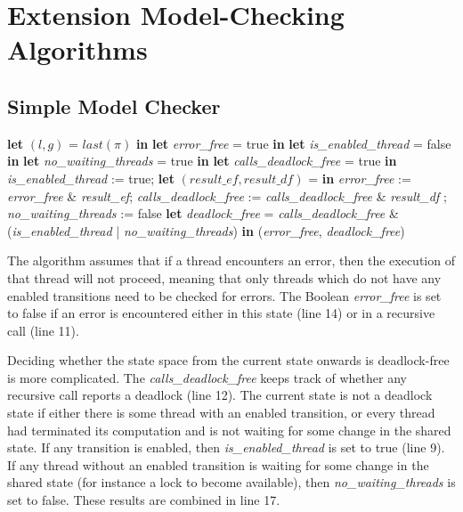 \documentclass[12pt,a4paper,twoside,openright]{report}
\newcommand{\Let}[2]{\State \textbf{let} #1 = #2 \textbf{in}}
\begin{document}
\chapter{Extension Model-Checking Algorithms}
\label{app:pseudocode}
\section{Simple Model Checker}
\label{sapp:simple-code}
\begin{algorithmic}[1]
	\Let{$(l, g)$}
	{$\textit{last}(\pi)$}
	\Let{\textit{error\_free}}{true}
	\Let{\textit{is\_enabled\_thread}}{false}
	\Let{\textit{no\_waiting\_threads}}{true}
	\Let{\textit{calls\_deadlock\_free}}{true}
	\State \textit{is\_enabled\_thread} := true;
	\Let{$(\textit{result\_ef}, \textit{result\_df})$}
	{\Call{Check}{$\sigma_0, \pi.\textit{next}(\sigma, p)$}}
	\State \textit{error\_free} := \textit{error\_free}
	\& \textit{result\_ef};
	\State \textit{calls\_deadlock\_free}
	:= \textit{calls\_deadlock\_free}
	\& \textit{result\_df}
	\Else
	;
	\EndIf
	{\textit{no\_waiting\_threads} := false}
	\EndIf
	\EndIf
	\EndFor
	\Let{\textit{deadlock\_free}}{\textit{calls\_deadlock\_free} \&
		(\textit{is\_enabled\_thread} | \textit{no\_waiting\_threads})}
	\State \Return (\textit{error\_free}, \textit{deadlock\_free})
	\EndProcedure
\end{algorithmic}

The algorithm assumes that if a thread
encounters an error, then the execution
of that thread will not proceed, meaning
that only threads which do not have any
enabled transitions need to be checked
for errors. The Boolean \textit{error\_free}
is set to false if an error is encountered
either in this state (line 14) or in a
recursive call (line 11).

Deciding whether the state space from the current
state onwards is deadlock-free is more complicated.
The \textit{calls\_deadlock\_free} keeps track of
whether any recursive call reports a deadlock (line 12).
The current state is not a deadlock state
if either there is some thread with an
enabled transition,
or every thread had terminated its computation and
is not waiting for some change in the shared state.
If any transition is enabled, then
\textit{is\_enabled\_thread} is set to true (line 9).
If any thread without an enabled transition is
waiting for some change in the shared state (for
instance a lock to become available), then
\textit{no\_waiting\_threads} is set to false.
These results are combined in line 17.
\end{document}

